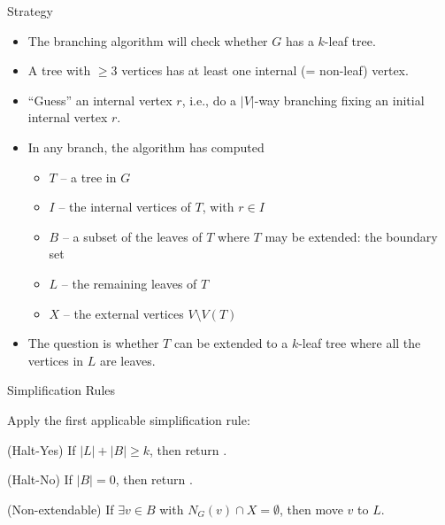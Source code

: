 \begin{frame}{Strategy}

 \begin{itemize}
  \item The branching algorithm will check whether $G$ has a $k$-leaf tree.
  \item A tree with $\ge 3$ vertices has at least one \alert{internal} (= non-leaf) vertex.
  \item ``Guess'' an internal vertex $r$, i.e., do a $|V|$-way branching fixing an initial internal vertex $r$.
  \pause
  \item In any branch, the algorithm has computed
   \begin{itemize}
    \item $T$ -- a tree in $G$
    \item $I$ -- the internal vertices of $T$, with $r\in I$
    \item $B$ -- a subset of the leaves of $T$ where $T$ may be extended: the boundary set
    \item $L$ -- the remaining leaves of $T$
    \item $X$ -- the external vertices $V\setminus V(T)$
   \end{itemize}
  \pause
  \item The question is whether $T$ can be extended to a $k$-leaf tree where all the vertices in $L$ are leaves.
 \end{itemize}
 
\end{frame}


\begin{frame}{Simplification Rules}

 Apply the first applicable simplification rule:
 
 \begin{block}{(Halt-Yes)}
  If $|L|+|B|\ge k$, then return \Yes.
 \end{block}

 \begin{block}{(Halt-No)}
  If $|B|=0$, then return \No.
 \end{block}
 
 \begin{block}{(Non-extendable)}
  If $\exists v\in B$ with $N_G(v) \cap X = \emptyset$, then move $v$ to $L$. 
 \end{block}

\end{frame}


